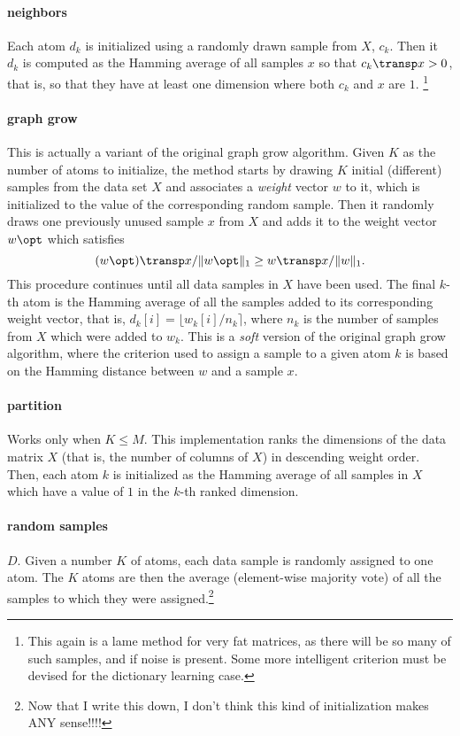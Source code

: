\documentclass[a4paper]{IEEEtran}
\begin{document}
\paragraph{neighbors} Each atom $d_k$ is initialized using a randomly drawn sample from $X$, $c_k$. Then
  it $d_k$ is
  computed as the Hamming average of all samples $x$ so that $c_k\transp x > 0$, that is, so that
  they have at least one dimension where both $c_k$ and $x$ are $1$. \footnote{This again is a lame method for
  very fat matrices, as there will be so many of such samples, and if noise is present. Some more
  intelligent criterion must be devised for the dictionary learning case.}
\paragraph{graph grow} This is actually a variant of the original graph grow algorithm. Given $K$ as the
  number of atoms to initialize, the method starts by drawing $K$ initial (different) samples from the
  data set $X$ and associates a \emph{weight} vector $w$ to it, which is initialized to the value of the
  corresponding random sample. Then it randomly draws one previously unused sample $x$ from $X$ and adds
  it to the weight vector $w\opt$ which satisfies
$$(w\opt)\transp x/\|w\opt\|_1 \geq
  w\transp x/\|w\|_1.$$ This procedure continues until all data samples in $X$ have been used. The final $k$-th atom is the Hamming average of all the samples added to its corresponding
  weight vector, that is, $d_k[i] = \lfloor w_k[i] / n_k \rceil$, where $n_k$ is the number of
  samples from $X$ which were added to $w_k$. This is a \emph{soft} version of the original graph grow algorithm, where the
  criterion used to assign a sample to a given atom $k$ is based on the Hamming distance between $w$
  and a sample $x$.
\paragraph{partition} Works only when $K \leq M$. This implementation ranks the 
  dimensions of the data matrix $X$ (that is, the number of columns of $X$) in descending weight order. Then, each atom
  $k$ is initialized as the Hamming average of all samples in $X$ which have a value of $1$ in the $k$-th
  ranked dimension.
\paragraph{random samples} $D$. Given a number $K$ of atoms, each data sample is randomly assigned to one
  atom. The $K$ atoms are then the average (element-wise majority vote) of all the samples to which
  they were assigned.\footnote{Now that I write this down, I don't think this kind of initialization makes ANY sense!!!!}
\end{document}
